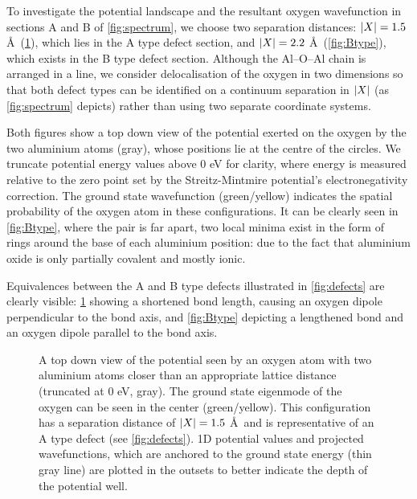 To investigate the potential landscape and the resultant oxygen wavefunction in sections A and B of \cref{fig:spectrum}, we choose two separation distances: $\lvert X\rvert = 1.5$ \AA\ (\cref{fig:Atype}), which lies in the A type defect section, and $\lvert X\rvert = 2.2$ \AA\ (\cref{fig:Btype}), which exists in the B type defect section.
Although the Al--O--Al chain is arranged in a line, we consider delocalisation of the oxygen in two dimensions so that both defect types can be identified on a continuum separation in $\lvert X\rvert$ (as \cref{fig:spectrum} depicts) rather than using two separate coordinate systems.

Both figures show a top down view of the potential exerted on the oxygen by the two aluminium atoms (gray), whose positions lie at the centre of the circles.
We truncate potential energy values above $0$ eV for clarity, where energy is measured relative to the zero point set by the Streitz-Mintmire potential's electronegativity correction. The ground state wavefunction (green/yellow) indicates the spatial probability of the oxygen atom in these configurations.
It can be clearly seen in \cref{fig:Btype}, where the pair is far apart, two local minima exist in the form of rings around the base of each aluminium position: due to the fact that aluminium oxide is only partially covalent and mostly ionic.

Equivalences between the A and B type defects illustrated in \cref{fig:defects} are clearly visible: \cref{fig:Atype} showing a shortened bond length, causing an oxygen dipole perpendicular to the bond axis, and \cref{fig:Btype} depicting a lengthened bond and an oxygen dipole parallel to the bond axis.


\begin{figure}[htp]
\caption[fig3]{\label{fig:Atype}A top down view of the potential seen by an oxygen atom with two aluminium atoms closer than an appropriate lattice distance (truncated at $0$ eV, gray). The ground state eigenmode of the oxygen can be seen in the center (green/yellow). This configuration has a separation distance of $\lvert X\rvert = 1.5$ \AA\ and is representative of an A type defect (see \cref{fig:defects}). 1D potential values and projected wavefunctions, which are anchored to the ground state energy (thin gray line) are plotted in the outsets to better indicate the depth of the potential well.}
\end{figure}

